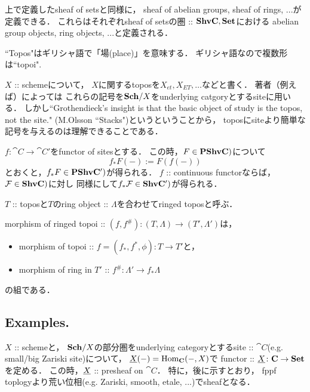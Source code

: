 \begin{Remark}
    上で定義したsheaf of setsと同様に，
    sheaf of abelian groups, sheaf of rings, ...が定義できる．
    これらはそれぞれsheaf of setsの圏 :: $\mathbf{Shv}\mathbf{C}, \mathbf{Set}$における
    abelian group objects, ring objects, ...と定義される．
\end{Remark}

\begin{Remark}
    ``Topos"はギリシャ語で「場(place)」を意味する．
    ギリシャ語なので複数形は``topoi".

    $X$ :: schemeについて，
    $X$に関するtoposを$X_{et}, X_{ET}, \dots$などと書く．
    著者（例えば\cite{SP}）によっては
    これらの記号を$\mathbf{Sch}/X$をunderlying catgoryとするsiteに用いる．
    しかし``Grothendieck’s insight is that the basic object of study is the topos, not the site."
    (M.Olsson ``Stacks")というということから，
    toposにsiteより簡単な記号を与えるのは理解できることである．
\end{Remark}

\begin{Def}
    $f \colon \cat{C} \to \cat{C}'$をfunctor of sitesとする．
    この時，$F \in \mathbf{PShv}\mathbf{C})$について
    \[ f_*F(-):=F(f(-)) \]
    とおくと，$f_* F \in \mathbf{PShv}\mathbf{C}')$が得られる．
    $f$ :: continuous functorならば，
    $\mathcal{F} \in \mathbf{Shv}\mathbf{C})$に対し
    同様にして$f_*\mathcal{F} \in \mathbf{Shv}\mathbf{C}')$が得られる．
\end{Def}

\begin{Def}
\begin{myenum}
    \item
    $T$ :: toposと$T$のring object :: $\Lambda$を合わせてringed toposと呼ぶ．

    \item
    morphism of ringed topoi :: $(f, f^{\#}) \colon (T, \Lambda) \to (T', \Lambda')$は，
    \begin{itemize}
        \item morphism of topoi :: $f=(f_*, f^*, \phi) \colon T \to T'$と，
        \item morphism of ring in $T'$ :: $f^{\#} \colon \Lambda' \to f_* \Lambda$
    \end{itemize}
    の組である．
\end{myenum}
\end{Def}

\subsection{Examples.}
\begin{Example}
    $X$ :: schemeと，
    $\mathbf{Sch}/X$の部分圏をunderlying categoryとするsite :: $\cat{C}$(e.g. small/big Zariski site)について，
    $\underline{X}(-)=\operatorname{Hom}_{\mathbf{C}}(-, X)$で
    functor :: $\underline{X} \colon \mathbf{C} \to \mathbf{Set}$を定める．
    この時，$\underline{X}$ :: presheaf on $\cat{C}$．
    特に，後に示すとおり，
    fppf toplogyより荒い位相(e.g. Zariski, smooth, etale, ...)でsheafとなる．
\end{Example}

